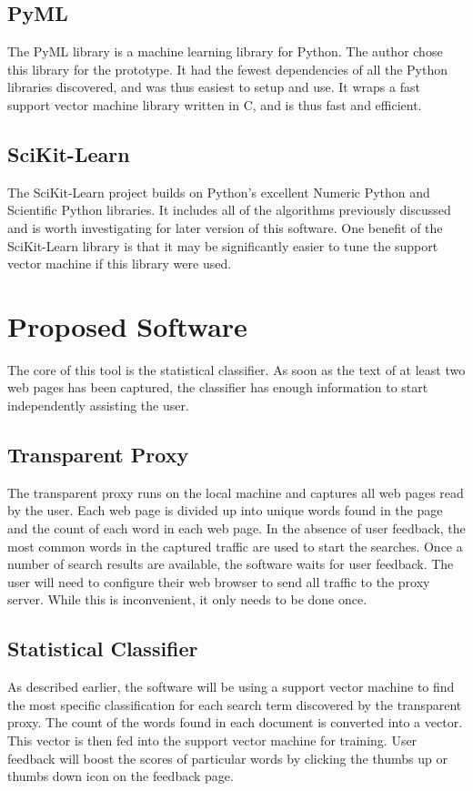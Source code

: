 \documentclass[12pt]{article}
\begin{document}
\subsection{PyML}
The PyML library is a machine learning library for Python. The author chose this library for the prototype. It
had the fewest dependencies of all the Python libraries discovered, and was thus easiest to setup and use. It
wraps a fast support vector machine library written in C, and is thus fast and efficient.
\subsection{SciKit-Learn}
The SciKit-Learn project builds on Python's excellent Numeric Python and Scientific Python libraries. It
includes all of the algorithms previously discussed and is worth investigating for later version of this
software. One benefit of the SciKit-Learn library is that it may be significantly easier to tune the support
vector machine if this library were used.
\section{Proposed Software}
The core of this tool is the statistical classifier. As soon as the text of at least two web pages has been
captured, the classifier has enough information to start independently assisting the user.
\subsection{Transparent Proxy}
The transparent proxy runs on the local machine and captures all web pages read by the user. Each web
page is divided up into unique words found in the page and the count of each word in each web page.
In the absence of user feedback, the most common words in the captured traffic are used to start the
searches. Once a number of search results are available, the software waits for user feedback.
The user will need to configure their web browser to send all traffic to the proxy server. While this is
inconvenient, it only needs to be done once.
\subsection{Statistical Classifier}
As described earlier, the software will be using a support vector machine to find the most specific
classification for each search term discovered by the transparent proxy. The count of the words found in each
document is converted into a vector. This vector is then fed into the support vector machine for
training. User feedback will boost the scores of particular words by clicking the thumbs up or thumbs down
icon on the feedback page.
\end{document}
